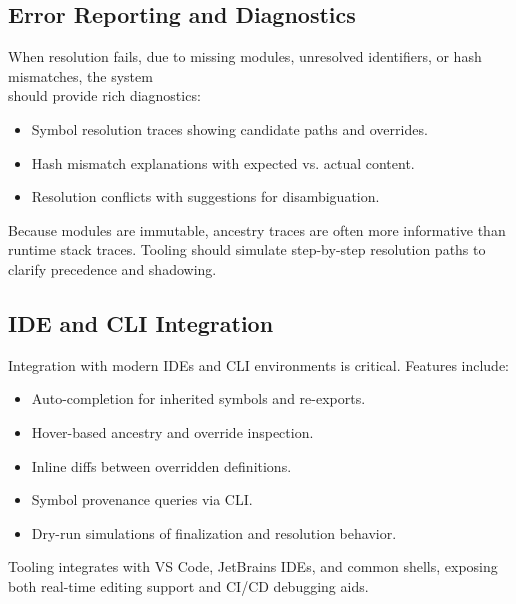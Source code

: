 \documentclass[sigplan,screen]{acmart}
\begin{document}
\subsection{Error Reporting and Diagnostics}

When resolution fails, due to missing modules, unresolved identifiers, or hash mismatches, the system \\should provide rich diagnostics:
\begin{itemize}
	\item Symbol resolution traces showing candidate paths and overrides.
	\item Hash mismatch explanations with expected vs. actual content.
	\item Resolution conflicts with suggestions for disambiguation.
\end{itemize}

Because modules are immutable, ancestry traces are often more informative than runtime stack traces. Tooling should simulate step-by-step resolution paths to clarify precedence and shadowing.

\subsection{IDE and CLI Integration}

Integration with modern IDEs and CLI environments is critical. Features include:

\begin{itemize}
	\item Auto-completion for inherited symbols and re-exports.
	\item Hover-based ancestry and override inspection.
	\item Inline diffs between overridden definitions.
	\item Symbol provenance queries via CLI.
	\item Dry-run simulations of finalization and resolution behavior.
\end{itemize}

Tooling integrates with VS Code, JetBrains IDEs, and common shells, exposing both real-time editing support and CI/CD debugging aids.
\end{document}
